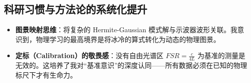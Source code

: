 \documentclass[12pt,a4paper]{article}
\begin{document}
\subsection{科研习惯与方法论的系统化提升}
\begin{itemize}
    \item \textbf{图景映射思维}：将复杂的 Hermite-Gaussian 模式解与示波器波形关联。我意识到，物理学习的最高境界是将冰冷的算式转化为动态的物理图景。
    \item \textbf{定标（Calibration）的敬畏感}：没有自由光谱区 $FSR = \frac{c}{4L}$ 为基准的测量是无效的。这培养了我对“基准意识”的深度认同——所有数据必须在已知的物理标尺下才有生命力。
\end{itemize}
\end{document}
